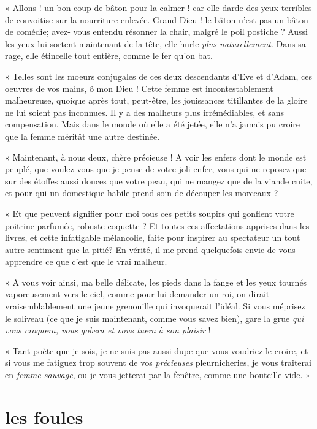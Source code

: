 \pagebreak 
« Allons ! un bon coup de bâton pour la calmer ! car elle darde des yeux
terribles de convoitise sur la nourriture enlevée. Grand Dieu ! le
bâton n’est pas un bâton de comédie; avez{}- vous
entendu résonner la chair, malgré le poil postiche ? Aussi les yeux lui
sortent maintenant de la tête, elle hurle \textit{plus naturellement}. Dans sa
rage, elle étincelle tout entière, comme le fer qu’on
bat.

« Telles sont les moeurs conjugales de ces deux descendants
d’Eve et d’Adam, ces oeuvres de vos
mains, ô mon Dieu ! Cette femme est incontestablement malheureuse,
quoique après tout, peut{}-être, les jouissances titillantes de la
gloire ne lui soient pas inconnues. Il y a des malheurs plus
irrémédiables, et sans compensation. Mais dans le monde où elle a été
jetée, elle n’a jamais pu croire que la femme méritât
une autre destinée.

« Maintenant, à nous deux, chère précieuse ! A voir les enfers dont le 
monde est peuplé, que voulez{}-vous que je pense de votre joli enfer,
vous qui ne reposez que sur des étoffes aussi douces que votre peau,
qui ne mangez que de la viande cuite, et pour qui un domestique habile
prend soin de découper les morceaux ?

« Et que peuvent signifier pour moi tous ces petits soupirs qui gonflent
votre poitrine parfumée, robuste coquette ? Et toutes ces affectations
apprises dans les livres, et cette infatigable mélancolie, faite pour inspirer au spectateur un tout autre
sentiment que la pitié? En vérité, il me prend quelquefois envie de
vous apprendre ce que c’est que le vrai malheur.

« A vous voir ainsi, ma belle délicate, les pieds dans la fange et les
yeux tournés vaporeusement vers le ciel, comme pour lui demander un
roi, on dirait vraisemblablement une jeune grenouille qui invoquerait
l’idéal. Si vous méprisez le soliveau (ce que je suis
maintenant, comme vous savez bien), gare la grue \textit{qui vous croquera,
vous gobera et vous tuera à son plaisir} !

\pagebreak 
« Tant poète que je sois, je ne suis pas aussi dupe que vous voudriez le
croire, et si vous me fatiguez trop souvent de vos \textit{précieuses}
pleurnicheries, je vous traiterai en \textit{femme sauvage}, ou je vous jetterai
par la fenêtre, comme une bouteille vide. »

\quebra\section[Les foules]{les foules}

